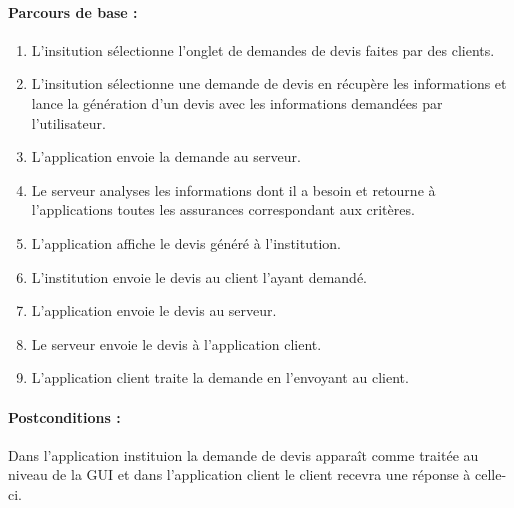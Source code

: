 \documentclass[../annexe.tex]{subfiles}
\begin{document}
		\paragraph{Parcours de base :}
		\begin{enumerate}
				\item L'insitution sélectionne l'onglet de demandes de devis faites par des clients.
				\item L'insitution sélectionne une demande de devis en récupère les informations et lance la génération d'un devis avec les informations demandées par l'utilisateur.
				\item L'application envoie la demande au serveur.
				\item Le serveur analyses les informations dont il a besoin et retourne à l'applications toutes les assurances correspondant aux critères.
				\item L'application affiche le devis généré à l'institution.
				\item L'institution envoie le devis au client l'ayant demandé.
				\item L'application envoie le devis au serveur.
				\item Le serveur envoie le devis à l'application client.
				\item L'application client traite la demande en l'envoyant au client.
		\end{enumerate}
		\paragraph{Postconditions :}
		Dans l'application instituion la demande de devis apparaît comme traitée au niveau de la GUI et dans l'application client le client recevra une réponse à celle-ci.
\newpage
\end{document}
